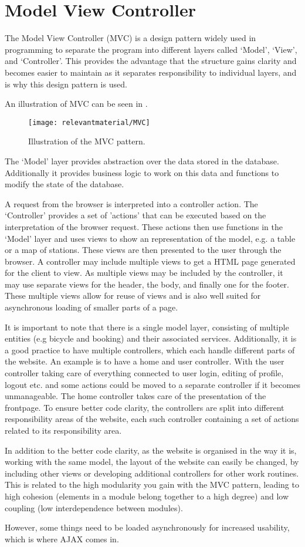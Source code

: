 \section{Model View Controller}\label{sec:mvc}
The Model View Controller (MVC) is a design pattern widely used in programming to separate the program into different layers called `Model', `View', and `Controller'.
This provides the advantage that the structure gains clarity and becomes easier to maintain as it separates responsibility to individual layers, and is why this design pattern is used.

An illustration of MVC can be seen in .
\begin{figure}[h]
	\centering
	\texttt{[image: relevantmaterial/MVC]}
	\caption{Illustration of the MVC pattern.}\label{fig:MVC}
\end{figure}

The `Model' layer provides abstraction over the data stored in the database.
Additionally it provides business logic to work on this data and functions to modify the state of the database.

A request from the browser is interpreted into a controller action.
The `Controller' provides a set of 'actions' that can be executed based on the interpretation of the browser request. 
These actions then use functions in the `Model' layer and uses views to show an representation of the model, e.g. a table or a map of stations. 
These views are then presented to the user through the browser.
A controller may include multiple views to get a HTML page generated for the client to view.
As multiple views may be included by the controller, it may use separate views for the header, the body, and finally one for the footer. 
These multiple views allow for reuse of views and is also well suited for asynchronous loading of smaller parts of a page.

It is important to note that there is a single model layer, consisting of multiple entities (e.g bicycle and booking) and their associated services.
Additionally, it is a good practice to have multiple controllers, which each handle different parts of the website.
An example is to have a home and user controller.
With the user controller taking care of everything connected to user login, editing of profile, logout etc. and some actions could be moved to a separate controller if it becomes unmanageable.
The home controller takes care of the presentation of the frontpage.
To ensure better code clarity, the controllers are split into different responsibility areas of the website, each such controller containing a set of actions related to its responsibility area.

In addition to the better code clarity, as the website is organised in the way it is, working with the same model, the layout of the website can easily be changed, by including other views or developing additional controllers for other work routines.
This is related to the high modularity you gain with the MVC pattern, leading to high cohesion (elements in a module belong together to a high degree) and low coupling (low interdependence between modules).

However, some things need to be loaded asynchronously for increased usability, which is where AJAX comes in.